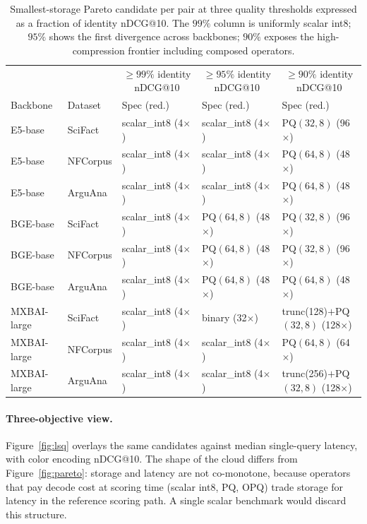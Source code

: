 \documentclass[sigconf]{acmart}
\makeatletter
\newcommand{\ndcg}{nDCG@10}
\makeatother
\begin{document}
\begin{table}[t]
\centering
\small
\caption{Smallest-storage Pareto candidate per pair at three quality thresholds expressed as a fraction of identity \ndcg{}. The $99\%$ column is uniformly scalar int8; $95\%$ shows the first divergence across backbones; $90\%$ exposes the high-compression frontier including composed operators.}
\label{tab:thresholds}
\begin{tabular}{lllll}
\toprule
& & \multicolumn{1}{c}{$\ge\!99\%$ identity \ndcg{}} & \multicolumn{1}{c}{$\ge\!95\%$ identity \ndcg{}} & \multicolumn{1}{c}{$\ge\!90\%$ identity \ndcg{}} \\
Backbone & Dataset & Spec (red.) & Spec (red.) & Spec (red.) \\
\midrule
E5-base      & SciFact  & scalar\_int8 (4$\times$) & scalar\_int8 (4$\times$)        & PQ$(32,8)$ (96$\times$) \\
E5-base      & NFCorpus & scalar\_int8 (4$\times$) & scalar\_int8 (4$\times$)        & PQ$(64,8)$ (48$\times$) \\
E5-base      & ArguAna  & scalar\_int8 (4$\times$) & scalar\_int8 (4$\times$)        & PQ$(64,8)$ (48$\times$) \\
BGE-base     & SciFact  & scalar\_int8 (4$\times$) & PQ$(64,8)$ (48$\times$)         & PQ$(32,8)$ (96$\times$) \\
BGE-base     & NFCorpus & scalar\_int8 (4$\times$) & PQ$(64,8)$ (48$\times$)         & PQ$(32,8)$ (96$\times$) \\
BGE-base     & ArguAna  & scalar\_int8 (4$\times$) & PQ$(64,8)$ (48$\times$)         & PQ$(64,8)$ (48$\times$) \\
MXBAI-large  & SciFact  & scalar\_int8 (4$\times$) & binary       (32$\times$)        & trunc(128)$+$PQ$(32,8)$ (128$\times$) \\
MXBAI-large  & NFCorpus & scalar\_int8 (4$\times$) & scalar\_int8 (4$\times$)         & PQ$(64,8)$ (64$\times$) \\
MXBAI-large  & ArguAna  & scalar\_int8 (4$\times$) & scalar\_int8 (4$\times$)         & trunc(256)$+$PQ$(32,8)$ (128$\times$) \\
\bottomrule
\end{tabular}
\end{table}

\paragraph{Three-objective view.} Figure~\ref{fig:lsq} overlays the same candidates against median single-query latency, with color encoding \ndcg{}. The shape of the cloud differs from Figure~\ref{fig:pareto}: storage and latency are not co-monotone, because operators that pay decode cost at scoring time (scalar int8, PQ, OPQ) trade storage for latency in the reference scoring path. A single scalar benchmark would discard this structure.
\end{document}
